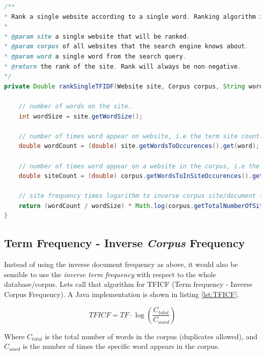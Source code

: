 \begin{lstlisting}[language=Java, caption=This is a code example., label=lst:TFIDF]
/**
* Rank a single website according to a single word. Ranking algorithm is TFIDF.
* 
* @param site a single website that will be ranked.
* @param corpus of all websites that the search engine knows about.
* @param word a single word from the search query.
* @return the rank of the site. Rank will always be non-negative.
*/
private Double rankSingleTFIDF(Website site, Corpus corpus, String word) {

	// number of words on the site.
	int wordSize = site.getWordSize();
	
	// number of times word appear on website, i.e the term site count.
	double wordCount = (double) site.getWordsToOccurences().get(word);
	
	// number of times word appear on a website in the corpus, i.e the site/document count.
	double siteCount = (double) corpus.getWordsToInSiteOccurences().get(word);
	
	// site frequency times logarithm to inverse corpus site/document frequency.
	return (wordCount / wordSize) * Math.log(corpus.getTotalNumberOfSites() / siteCount);
}
\end{lstlisting}


\subsection{Term Frequency - Inverse \emph{Corpus} Frequency}
Instead of using the inverse document frequency as above, it would also be sensible to use the \emph{inverse term frequency} with respect to the whole database/corpus. Lets call that algorithm for TFICF (Term frequency - Inverse Corpus Frequency). A Java implementation is shown in listing \ref{lst:TFICF}.
    
\[ TFICF = TF \cdot \log{\left( \frac{C_{total}}{C_{word}} \right) } \]

Where \(C_{total}\) is the total number of words in the corpus (duplicates allowed), and \(C_{word}\) is the number of times the specific word appears in the corpus. 

